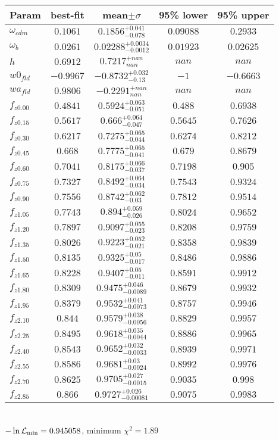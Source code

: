 \begin{tabular}{|l|c|c|c|c|} 
 \hline 
Param & best-fit & mean$\pm\sigma$ & 95\% lower & 95\% upper \\ \hline 
$\omega_{cdm }$ &$0.1061$ & $0.1856_{-0.078}^{+0.041}$ & $0.09088$ & $0.2933$ \\ 
$\omega_{b }$ &$0.0261$ & $0.02288_{-0.0012}^{+0.0034}$ & $0.01923$ & $0.02625$ \\ 
$h$ &$0.6912$ & $0.7217_{nan}^{+nan}$ & $nan$ & $nan$ \\ 
$w0_{fld }$ &$-0.9967$ & $-0.8732_{-0.13}^{+0.032}$ & $-1$ & $-0.6663$ \\ 
$wa_{fld }$ &$0.9806$ & $-0.2291_{nan}^{+nan}$ & $nan$ & $nan$ \\ 
$f_{z0.00 }$ &$0.4841$ & $0.5924_{-0.051}^{+0.063}$ & $0.488$ & $0.6938$ \\ 
$f_{z0.15 }$ &$0.5617$ & $0.666_{-0.047}^{+0.064}$ & $0.5645$ & $0.7626$ \\ 
$f_{z0.30 }$ &$0.6217$ & $0.7275_{-0.044}^{+0.065}$ & $0.6274$ & $0.8212$ \\ 
$f_{z0.45 }$ &$0.668$ & $0.7775_{-0.041}^{+0.065}$ & $0.679$ & $0.8679$ \\ 
$f_{z0.60 }$ &$0.7041$ & $0.8175_{-0.037}^{+0.066}$ & $0.7198$ & $0.905$ \\ 
$f_{z0.75 }$ &$0.7327$ & $0.8492_{-0.034}^{+0.064}$ & $0.7543$ & $0.9324$ \\ 
$f_{z0.90 }$ &$0.7556$ & $0.8742_{-0.03}^{+0.062}$ & $0.7812$ & $0.9514$ \\ 
$f_{z1.05 }$ &$0.7743$ & $0.894_{-0.026}^{+0.059}$ & $0.8024$ & $0.9652$ \\ 
$f_{z1.20 }$ &$0.7897$ & $0.9097_{-0.023}^{+0.055}$ & $0.8208$ & $0.9759$ \\ 
$f_{z1.35 }$ &$0.8026$ & $0.9223_{-0.021}^{+0.052}$ & $0.8358$ & $0.9839$ \\ 
$f_{z1.50 }$ &$0.8135$ & $0.9325_{-0.017}^{+0.05}$ & $0.8486$ & $0.9886$ \\ 
$f_{z1.65 }$ &$0.8228$ & $0.9407_{-0.011}^{+0.05}$ & $0.8591$ & $0.9912$ \\ 
$f_{z1.80 }$ &$0.8309$ & $0.9475_{-0.0089}^{+0.046}$ & $0.8679$ & $0.9932$ \\ 
$f_{z1.95 }$ &$0.8379$ & $0.9532_{-0.0073}^{+0.041}$ & $0.8757$ & $0.9946$ \\ 
$f_{z2.10 }$ &$0.844$ & $0.9579_{-0.0056}^{+0.038}$ & $0.8829$ & $0.9957$ \\ 
$f_{z2.25 }$ &$0.8495$ & $0.9618_{-0.0044}^{+0.035}$ & $0.8886$ & $0.9965$ \\ 
$f_{z2.40 }$ &$0.8543$ & $0.9652_{-0.0033}^{+0.032}$ & $0.8939$ & $0.9971$ \\ 
$f_{z2.55 }$ &$0.8586$ & $0.9681_{-0.0024}^{+0.03}$ & $0.8992$ & $0.9976$ \\ 
$f_{z2.70 }$ &$0.8625$ & $0.9705_{-0.0015}^{+0.027}$ & $0.9035$ & $0.998$ \\ 
$f_{z2.85 }$ &$0.866$ & $0.9727_{-0.00081}^{+0.026}$ & $0.9075$ & $0.9983$ \\ 
\hline 
 \end{tabular} \\ 
$-\ln{\cal L}_\mathrm{min} =0.945058$, minimum $\chi^2=1.89$ \\ 
